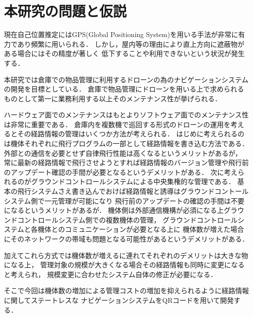 \section{本研究の問題と仮説}
現在自己位置推定にはGPS(Global Positioning System)を用いる手法が非常に有力であり頻繁に用いられる．
しかし，屋内等の理由により直上方向に遮蔽物がある場合にはその精度が著しく
低下することや利用できないという状況が発生する．

本研究では倉庫での物品管理に利用するドローンの為のナビゲーションシステムの開発を目標としている．
倉庫で物品管理にドローンを用いる上で求められるものとして第一に業務利用する以上そのメンテナンス性が挙げられる．

ハードウェア面でのメンテナンスはもとよりソフトウェア面でのメンテナンス性は非常に重要である．
倉庫内を複数機で巡回する形式のドローンの運用を考えるとその経路情報の管理はいくつか方法が考えられる．
はじめに考えられるのは機体それぞれに飛行プログラムの一部として経路情報を書き込む方法である．
外部との通信を必要とせず自律飛行性能は高くなるというメリットがあるが，
常に最新の経路情報で飛行させようとすれば経路情報のバージョン管理や飛行前のアップデート確認の手間が必要となるというデメリットがある．
次に考えられるのがグラウンドコントロールシステムによる中央集権的な管理である．
基本の飛行システムさえ書き込んでおけば経路情報と誘導はグラウンドコントールシステム側で一元管理が可能になり
飛行前のアップデートの確認の手間は不要になるというメリットがあるが．
機体側は外部通信機構が必須になる上グラウンドコントロールシステム側での複数機体の管理，
グラウンドコントロールシステムと各機体とのコミュニケーションが必要となる上に
機体数が増えた場合にそのネットワークの帯域も問題となる可能性があるというデメリットがある．

加えてこれら方式では機体数が増えるに連れてそれぞれのデメリットは大きな物になる上，
管理対象の規模が大きくなる場合その経路情報も同時に変更になると考えられ，
規模変更に合わせたシステム自体の修正が必要になる．

そこで今回は機体数の増加による管理コストの増加を抑えられるように経路情報に関してステートレスな
ナビゲーションシステムをQRコードを用いて開発する．